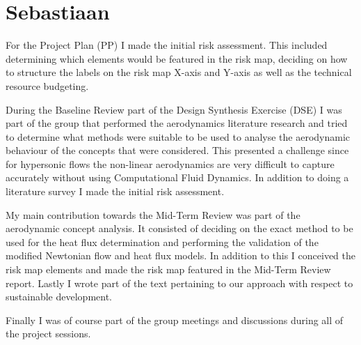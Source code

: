 \section{Sebastiaan}
For the Project Plan (PP) I made the initial risk assessment. This included determining which elements would be featured in the risk map, deciding on how to structure the labels on the risk map X-axis and Y-axis as well as the technical resource budgeting.

During the Baseline Review part of the Design Synthesis Exercise (DSE) I was part of the group that performed the aerodynamics literature research and tried to determine what methods were suitable to be used to analyse the aerodynamic behaviour of the concepts that were considered. This presented a challenge since for hypersonic flows the non-linear aerodynamics are very difficult to capture accurately without using Computational Fluid Dynamics. In addition to doing a literature survey I made the initial risk assessment.

My main contribution towards the Mid-Term Review was part of the aerodynamic concept analysis. It consisted of deciding on the exact method to be used for the heat flux determination and performing the validation of the modified Newtonian flow and heat flux models. In addition to this I conceived the risk map elements and made the risk map featured in the Mid-Term Review report. Lastly I wrote part of the text pertaining to our approach with respect to sustainable development.

Finally I was of course part of the group meetings and discussions during all of the project sessions.